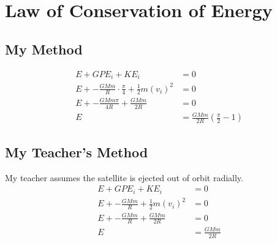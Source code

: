 \documentclass{article}
\begin{document}
\section{Law of Conservation of Energy}
    \subsection{My Method}

    \begin{align*}
        E + GPE_i + KE_i &= 0\\
        E + -\frac{GMm}{R} \cdot \frac{\pi}{4} + \frac{1}{2}m(v_i)^2 &= 0\\
         E + -\frac{GMm\pi}{4R} + \frac{GMm}{2R} &= 0\\
         E &= \boxed{\frac{GMm}{2R}(\frac{\pi}{2}-1)}
    \end{align*}

    \subsection{My Teacher's Method}
    My teacher assumes the satellite is ejected out of orbit radially.
    \begin{align*}
        E + GPE_i + KE_i &= 0\\
        E + -\frac{GMm}{R} + \frac{1}{2}m(v_i)^2 &= 0\\
         E + -\frac{GMm}{R} + \frac{GMm}{2R} &= 0\\
         E &= \boxed{\frac{GMm}{2R}}
    \end{align*}

    
\end{document}
